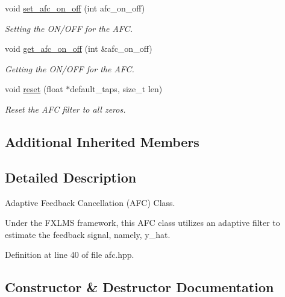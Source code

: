 \begin{DoxyCompactItemize}
void \hyperlink{classafc_a5e905d06e41380c61aec6221dbf203fb}{set\+\_\+afc\+\_\+on\+\_\+off} (int afc\+\_\+on\+\_\+off)
\begin{DoxyCompactList}\small\item\em Setting the O\+N/\+O\+FF for the A\+FC. \end{DoxyCompactList}\item 
void \hyperlink{classafc_a2119124c7589cb15a7b55568d5301073}{get\+\_\+afc\+\_\+on\+\_\+off} (int \&afc\+\_\+on\+\_\+off)
\begin{DoxyCompactList}\small\item\em Getting the O\+N/\+O\+FF for the A\+FC. \end{DoxyCompactList}\item 
void \hyperlink{classafc_a6f82d1ff5013e2311f099c3d4a911a75}{reset} (float $\ast$default\+\_\+taps, size\+\_\+t len)
\begin{DoxyCompactList}\small\item\em Reset the A\+FC filter to all zeros. \end{DoxyCompactList}\end{DoxyCompactItemize}
\subsection*{Additional Inherited Members}


\subsection{Detailed Description}
Adaptive Feedback Cancellation (A\+FC) Class. 

Under the F\+X\+L\+MS framework, this A\+FC class utilizes an adaptive filter to estimate the feedback signal, namely, y\+\_\+hat. 

Definition at line 40 of file afc.\+hpp.



\subsection{Constructor \& Destructor Documentation}
\mbox{\label{classafc_a2f6b513c6bbc373ee59b1dddcb71f6a4}} 
